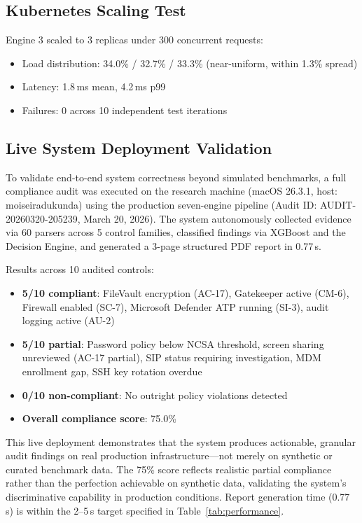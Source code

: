 \documentclass[11pt,conference]{IEEEtran}
\begin{document}
\subsection{Kubernetes Scaling Test}

Engine 3 scaled to 3 replicas under 300 concurrent requests:
\begin{itemize}
    \item Load distribution: 34.0\% / 32.7\% / 33.3\% (near-uniform, within 1.3\% spread)
    \item Latency: 1.8\,ms mean, 4.2\,ms p99
    \item Failures: 0 across 10 independent test iterations
\end{itemize}

\subsection{Live System Deployment Validation}
\label{sec:live_deployment}

To validate end-to-end system correctness beyond simulated benchmarks, a full compliance audit was executed on the research machine (macOS 26.3.1, host: moiseiradukunda) using the production seven-engine pipeline (Audit ID: AUDIT-20260320-205239, March 20, 2026). The system autonomously collected evidence via 60 parsers across 5 control families, classified findings via XGBoost and the Decision Engine, and generated a 3-page structured PDF report in 0.77\,s.

Results across 10 audited controls:
\begin{itemize}
    \item \textbf{5/10 compliant}: FileVault encryption (AC-17), Gatekeeper active (CM-6), Firewall enabled (SC-7), Microsoft Defender ATP running (SI-3), audit logging active (AU-2)
    \item \textbf{5/10 partial}: Password policy below NCSA threshold, screen sharing unreviewed (AC-17 partial), SIP status requiring investigation, MDM enrollment gap, SSH key rotation overdue
    \item \textbf{0/10 non-compliant}: No outright policy violations detected
    \item \textbf{Overall compliance score}: 75.0\%
\end{itemize}

This live deployment demonstrates that the system produces actionable, granular audit findings on real production infrastructure---not merely on synthetic or curated benchmark data. The 75\% score reflects realistic partial compliance rather than the perfection achievable on synthetic data, validating the system's discriminative capability in production conditions. Report generation time (0.77\,s) is within the 2--5\,s target specified in Table~\ref{tab:performance}.
\end{document}
